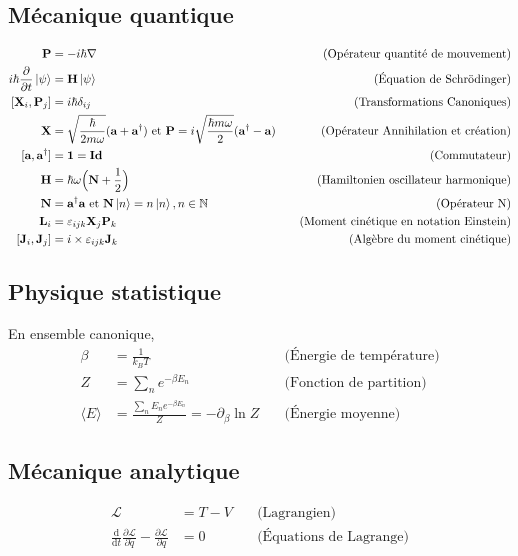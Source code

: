 \documentclass[a4paper,10pt]{report}
\begin{document}
	\subsection{Mécanique quantique}\label{subsubsec:quantique}
	\begin{align*}
		\textbf{P} &= -i \hbar \nabla \quad & \text{(Opérateur quantité de mouvement)} \\
		i \hbar \frac{\partial}{\partial t} \ket \psi &= \textbf{H}\ket \psi \quad & \text{(Équation de Schrödinger)}\\
		[\textbf{X}_i, \textbf{P}_j] &= i\hbar\delta_{ij}\quad & \text{(Transformations Canoniques)}\\
		\textbf{X} &= \sqrt {\frac{\hbar}{2m\omega}}(\textbf{a}+\textbf{a}^\dagger) \text{ et } \textbf{P} = i\sqrt {\frac{\hbar m\omega}{2}}(\textbf{a}^\dagger-\textbf{a}) \quad & \text{(Opérateur Annihilation et création)}\\
		[\textbf{a}, \textbf{a}^\dagger] &= \textbf{1} = \textbf{Id}\quad &\text{(Commutateur)}\\
		\textbf{H}&= \hbar \omega \Bigl(\textbf{N}+\frac 1 2\Bigr) \quad &\text{(Hamiltonien oscillateur harmonique)}\\
		\textbf{N} &= \textbf{a}^\dagger \textbf{a} \text{ et }\textbf{N}\ket n = n\ket n, n \in \mathbb{N} \quad &\text{(Opérateur N)}\\
		\textbf{L}_i&= \varepsilon_{ijk}\textbf{X}_j \textbf{P}_k \quad &\text{(Moment cinétique en notation Einstein)}\\
		[\textbf{J}_i, \textbf{J}_j]&= i\times \varepsilon_{ijk}\textbf{J}_k\quad &\text{(Algèbre du moment cinétique)}\\
		\end{align*}
	

	\subsection{Physique statistique}\label{subsubsec:statistique}
	En ensemble canonique,
	\begin{align*}
		\beta &= \frac 1 {k_B T} \quad & \text{(Énergie de température)}\\
		Z &= \sum_n e^{-\beta E_n} \quad & \text{(Fonction de partition)} \\
		\langle E \rangle &= \frac{\sum_n E_n e^{-\beta E_n}}{Z} = -\partial_\beta \ln Z \quad & \text{(Énergie moyenne)} 
		\end{align*}
	
	\subsection{Mécanique analytique}\label{subsubsec:analytique}
	\begin{align*}
		\mathcal L &= T - V \quad & \text{(Lagrangien)} \\
		\frac{\text{d}}{\text{d}t} \frac{\partial \mathcal L}{\partial \dot{q}} - \frac{\partial \mathcal L}{\partial q} &= 0 \quad & \text{(Équations de Lagrange)}
	\end{align*}
\end{document}
